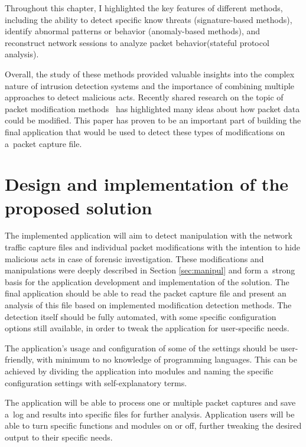 \documentclass[
  printed,     %
  color,       %
  oneside,     %
  nosansbold,  %
  nocolorbold, %
  nolof,         %
  nolot,         %
]{fithesis4}
\begin{document}
Throughout this chapter, I highlighted the key features of different methods, including the ability to detect specific know threats (signature-based methods), identify abnormal patterns or behavior (anomaly-based methods), and reconstruct network sessions to analyze packet behavior(stateful protocol analysis).

Overall, the study of these methods provided valuable insights into the complex nature of intrusion detection systems and the importance of combining multiple approaches to detect malicious acts. Recently shared research on the topic of packet modification methods~\cite{Howcanne5:online} has highlighted many ideas about how packet data could be modified. This paper has proven to be an important part of building the final application that would be used to detect these types of modifications on a~packet capture file.

\newpage
\chapter{Design and implementation of the proposed solution}
\label{chap:desimp}

The implemented application will aim to detect manipulation with the network traffic capture files and individual packet modifications with the intention to hide malicious acts in case of forensic investigation. These modifications and manipulations were deeply described in Section \ref{sec:manipul} and form a~strong basis for the application development and implementation of the solution. The final application should be able to read the packet capture file and present an analysis of this file based on implemented modification detection methods. The detection itself should be fully automated, with some specific configuration options still available, in order to tweak the application for user-specific needs.

The application's usage and configuration of some of the settings should be user-friendly, with minimum to no knowledge of programming languages. This can be achieved by dividing the application into modules and naming the specific configuration settings with self-explanatory terms.

The application will be able to process one or multiple packet captures and save a~log and results into specific files for further analysis. Application users will be able to turn specific functions and modules on or off, further tweaking the desired output to their specific needs.
\end{document}
